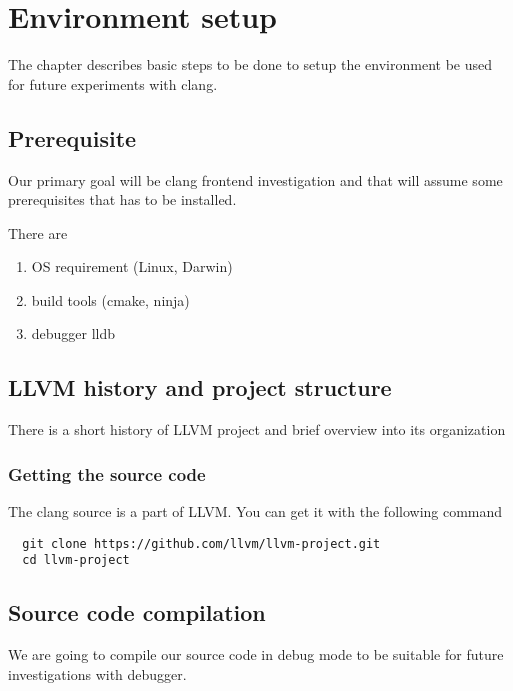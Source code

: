 \chapter{Environment setup}

The chapter describes basic steps to be done to setup the environment
be used for future experiments with clang.

\section{Prerequisite}
Our primary goal will be clang frontend investigation and that will assume some
prerequisites that has to be installed.

There are
\begin{enumerate}
\item OS requirement (Linux, Darwin)
\item build tools (cmake, ninja)
\item debugger lldb
\end{enumerate}

\section{LLVM history and project structure}

There is a short history of LLVM project and brief overview into its
organization 

\subsection{Getting the source code}

The clang source is a part of LLVM. You can get it with the following
command
\begin{verbatim}
  git clone https://github.com/llvm/llvm-project.git
  cd llvm-project
\end{verbatim}

\section{Source code compilation}

We are going to compile our source code in debug mode to be suitable
for future investigations with debugger.

